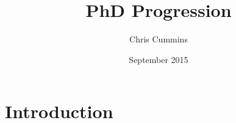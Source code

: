 \documentclass[11pt]{article}
\author{Chris Cummins}
\date{September 2015}
\title{PhD Progression}
\begin{document}
\section{Introduction}\label{sec:introduction}

\lipsum


\label{bibliography}
\printbibliography
\end{document}
